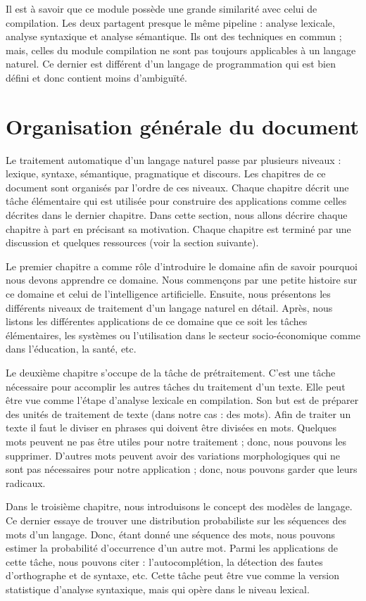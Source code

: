 \documentclass{KodeBook}
\begin{document}
Il est à savoir que ce module possède une grande similarité avec celui de compilation.
Les deux partagent presque le même pipeline : analyse lexicale, analyse syntaxique et analyse sémantique.
Ils ont des techniques en commun ; mais, celles du module compilation ne sont pas toujours applicables à un langage naturel.
Ce dernier est différent d'un langage de programmation qui est bien défini et donc contient moins d'ambiguïté.



\section*{Organisation générale du document}

Le traitement automatique d'un langage naturel passe par plusieurs niveaux : lexique, syntaxe, sémantique, pragmatique et discours. 
Les chapitres de ce document sont organisés par l'ordre de ces niveaux.
Chaque chapitre décrit une tâche élémentaire qui est utilisée pour construire des applications comme celles décrites dans le dernier chapitre.
Dans cette section, nous allons décrire chaque chapitre à part en précisant sa motivation.
Chaque chapitre est terminé par une discussion et quelques ressources (voir la section suivante).


Le premier chapitre a comme rôle d'introduire le domaine afin de savoir pourquoi nous devons apprendre ce domaine.
Nous commençons par une petite histoire sur ce domaine et celui de l'intelligence artificielle.
Ensuite, nous présentons les différents niveaux de traitement d'un langage naturel en détail.
Après, nous listons les différentes applications de ce domaine que ce soit les tâches élémentaires, les systèmes ou l'utilisation dans le secteur socio-économique comme dans l'éducation, la santé, etc. 


Le deuxième chapitre s'occupe de la tâche de prétraitement.
C'est une tâche nécessaire pour accomplir les autres tâches du traitement d'un texte.
Elle peut être vue comme l'étape d'analyse lexicale en compilation.
Son but est de préparer des unités de traitement de texte (dans notre cas : des mots).
Afin de traiter un texte il faut le diviser en phrases qui doivent être divisées en mots.
Quelques mots peuvent ne pas être utiles pour notre traitement ; donc, nous pouvons les supprimer.
D'autres mots peuvent avoir des variations morphologiques qui ne sont pas nécessaires pour notre application ; donc, nous pouvons garder que leurs radicaux.


Dans le troisième chapitre, nous introduisons le concept des modèles de langage.
Ce dernier essaye de trouver une distribution probabiliste sur les séquences des mots d'un langage.
Donc, étant donné une séquence des mots, nous pouvons estimer la probabilité d'occurrence d'un autre mot.
Parmi les applications de cette tâche, nous pouvons citer : l'autocomplétion, la détection des fautes d'orthographe et de syntaxe, etc.
Cette tâche peut être vue comme la version statistique d'analyse syntaxique, mais qui opère dans le niveau lexical.
\end{document}
